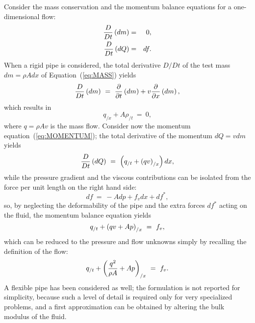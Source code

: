 \documentclass[10pt,dvips,fleqn,subeqn]{report}
\begin{document}
Consider the mass conservation and the momentum balance equations for a
one-dimensional flow:
\begin{eqnarray}
    \frac{D}{Dt}\left( dm \right) & = & 0 , \label{eq:MASS} \\
    \frac{D}{Dt}\left( dQ \right) & = & df . \label{eq:MOMENTUM}
\end{eqnarray}
When a rigid pipe is considered, the total derivative $D/Dt$ of the test
mass $dm=\rho{Adx}$ of Equation~(\ref{eq:MASS}) yields 
\begin{equation} 
    \frac{D}{Dt}\plbr{dm} \ = \ 
    \frac{\partial}{\partial{t}}\plbr{dm}
    + v \frac{\partial}{\partial{x}}\plbr{dm} ,
\end{equation}
which results in
\begin{equation}
    q_{/x} + A\rho_{/t} \ = \ 0 ,
\end{equation}
where $q=\rho{Av}$ is the mass flow.
Consider now the momentum equation~(\ref{eq:MOMENTUM}); the total derivative
of the momentum $dQ=vdm$ yields
\begin{equation}
    \frac{D}{Dt}\plbr{dQ} \ = \ \plbr{q_{/t} + \plbr{qv}_{/x}}dx ,
\end{equation}
while the pressure gradient and the viscous contributions can be isolated
from the force per unit length on the right hand side:
\begin{equation}
    df \ = \ - Adp + f_v dx + df^* ,
\end{equation}
so, by neglecting the deformability of the pipe and the extra forces $df^*$
acting on the fluid, the momentum balance equation yields
\begin{equation}
    q_{/t} + \left( qv + Ap \right)_{/x} \ = \ f_v ,
\end{equation}
which can be reduced to the pressure and flow unknowns simply by recalling
the definition of the flow:
\begin{equation}
    q_{/t} + \left( \frac{q^2}{\rho{A}} + Ap \right)_{/x} \ = \ f_v .
\end{equation}
A flexible pipe has been considered as well; the formulation is not reported
for simplicity, because such a level of detail is required only for very
specialized problems, and a first approximation can be obtained by altering
the bulk modulus of the fluid.
\end{document}
